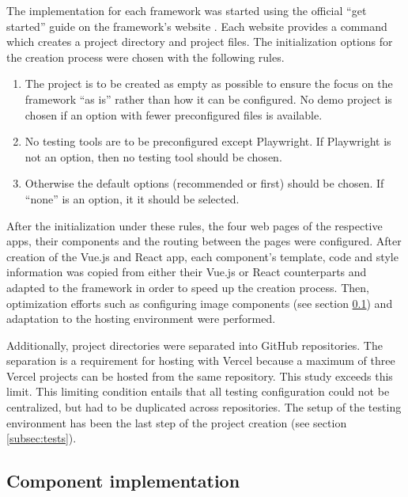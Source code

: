 \documentclass[a4paper, 12pt]{article}
\begin{document}
The implementation for each framework was started using the official \enquote{get started} guide on the framework's website \citep{AngularGetStarted,AstroGetStarted,NextGetStarted,NuxtGetStarted,ReactGetStarted,SvelteGetStarted,VueGetStarted}.
Each website provides a command which creates a project directory and project files.
The initialization options for the creation process were chosen with the following rules.

\begin{enumerate}
  \item The project is to be created as empty as possible to ensure the focus on the framework \enquote{as is} rather than how it can be configured.
  No demo project is chosen if an option with fewer preconfigured files is available.
  \item No testing tools are to be preconfigured except Playwright.
  If Playwright is not an option, then no testing tool should be chosen.
  \item Otherwise the default options (recommended or first) should be chosen.
  If \enquote{none} is an option, it it should be selected.
\end{enumerate}

After the initialization under these rules, the four web pages of the respective apps, their components and the routing between the pages were configured.
After creation of the Vue.js and React app, each component's template, code and style information was copied from either their Vue.js or React counterparts and adapted to the framework in order to speed up the creation process.
Then, optimization efforts such as configuring image components (see section \ref{subsec:components}) and adaptation to the hosting environment were performed.

Additionally, project directories were separated into GitHub repositories.
The separation is a requirement for hosting with Vercel because a maximum of three Vercel projects can be hosted from the same repository.
This study exceeds this limit.
This limiting condition entails that all testing configuration could not be centralized, but had to be duplicated across repositories.
The setup of the testing environment has been the last step of the project creation (see section \ref{subsec:tests}).

\subsection{Component implementation}\label{subsec:components}
% 
\end{document}
